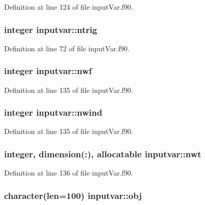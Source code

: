 Definition at line 124 of file input\-Var.\-f90.

\hypertarget{classinputvar_ae4403f5c5b16bf2cbd2b607a87e5ee9a}{
\subsubsection[{ntrig}]{\setlength{\rightskip}{0pt plus 5cm}integer inputvar\-::ntrig}}\label{classinputvar_ae4403f5c5b16bf2cbd2b607a87e5ee9a}


Definition at line 72 of file input\-Var.\-f90.

\hypertarget{classinputvar_a1da1d97ed067b07a4a7717bffd2552ee}{
\subsubsection[{nwf}]{\setlength{\rightskip}{0pt plus 5cm}integer inputvar\-::nwf}}\label{classinputvar_a1da1d97ed067b07a4a7717bffd2552ee}


Definition at line 135 of file input\-Var.\-f90.

\hypertarget{classinputvar_a02de598dd9d979229fdb815b3fbfcd04}{
\subsubsection[{nwind}]{\setlength{\rightskip}{0pt plus 5cm}integer inputvar\-::nwind}}\label{classinputvar_a02de598dd9d979229fdb815b3fbfcd04}


Definition at line 135 of file input\-Var.\-f90.

\hypertarget{classinputvar_a33759b5d3ac0ed8e83e2a56028668bc5}{
\subsubsection[{nwt}]{\setlength{\rightskip}{0pt plus 5cm}integer, dimension(\-:), allocatable inputvar\-::nwt}}\label{classinputvar_a33759b5d3ac0ed8e83e2a56028668bc5}


Definition at line 136 of file input\-Var.\-f90.

\hypertarget{classinputvar_ab5d2f467a214e31204c18a24582b81bb}{
\subsubsection[{obj}]{\setlength{\rightskip}{0pt plus 5cm}character(len=100) inputvar\-::obj}}\label{classinputvar_ab5d2f467a214e31204c18a24582b81bb}


